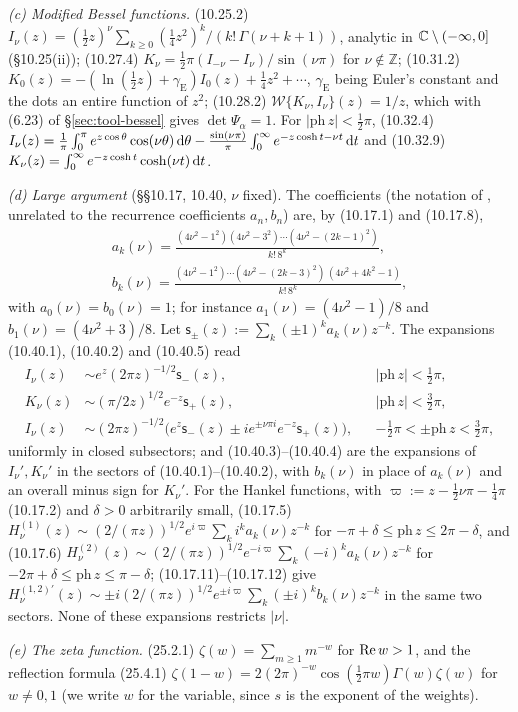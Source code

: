 \emph{(c) Modified Bessel functions.} (10.25.2)
$I_\nu(z)=(\frac12z)^\nu\sum_{k\ge0}(\frac14z^2)^k/(k!\,\Gamma(\nu+k+1))$, analytic in $\mathbb{C}\setminus(-\infty,0]$
(\S10.25(ii)); (10.27.4) $K_\nu=\frac12\pi(I_{-\nu}-I_\nu)/\sin(\nu\pi)$ for $\nu\notin\mathbb Z$; (10.31.2)
$K_0(z)=-(\ln(\frac12z)+\gamma_{\mathrm E})I_0(z)+\frac14z^2+\dotsb$, $\gamma_{\mathrm E}$ being Euler's constant and the
dots an entire function of $z^2$; (10.28.2) $\mathcal W\{K_\nu,I_\nu\}(z)=1/z$, which with (6.23) of
\S\ref{sec:tool-bessel} gives $\det\Psi_\alpha=1$. For $|\mathrm{ph}\,z|<\frac12\pi$, (10.32.4)
$I_\nu(z)=\frac1\pi\int_0^\pi e^{z\cos\theta}\cos(\nu\theta)\,\mathrm{d}\theta-\frac{\sin(\nu\pi)}\pi\int_0^\infty e^{-z\cosh t-\nu t}\,\mathrm{d} t$
and (10.32.9) $K_\nu(z)=\int_0^\infty e^{-z\cosh t}\cosh(\nu t)\,\mathrm{d} t$.

\emph{(d) Large argument} (\S\S10.17, 10.40, $\nu$ fixed). The coefficients (the notation of \cite{DLMF}, unrelated to the recurrence coefficients $a_n,b_n$) are, by (10.17.1) and (10.17.8),
\begin{gather*}
  a_k(\nu)=\frac{(4\nu^2-1^2)(4\nu^2-3^2)\cdots(4\nu^2-(2k-1)^2)}{k!\,8^k},\\
  b_k(\nu)=\frac{(4\nu^2-1^2)\cdots(4\nu^2-(2k-3)^2)\,(4\nu^2+4k^2-1)}{k!\,8^k},
\end{gather*}
with $a_0(\nu)=b_0(\nu)=1$; for instance $a_1(\nu)=(4\nu^2-1)/8$ and $b_1(\nu)=(4\nu^2+3)/8$. Let
$\mathsf s_\pm(z):=\sum_k(\pm1)^ka_k(\nu)z^{-k}$. The expansions (10.40.1), (10.40.2) and (10.40.5) read
\begin{align*}
  I_\nu(z)&\sim e^z(2\pi z)^{-1/2}\mathsf s_-(z),&&|\mathrm{ph}\,z|<\tfrac12\pi,\\
  K_\nu(z)&\sim(\pi/2z)^{1/2}e^{-z}\mathsf s_+(z),&&|\mathrm{ph}\,z|<\tfrac32\pi,\\
  I_\nu(z)&\sim(2\pi z)^{-1/2}\bigl(e^z\mathsf s_-(z)\pm ie^{\pm\nu\pi i}e^{-z}\mathsf s_+(z)\bigr),
    &&-\tfrac12\pi<\pm\mathrm{ph}\,z<\tfrac32\pi,
\end{align*}
uniformly in closed subsectors; and (10.40.3)--(10.40.4) are the expansions of $I_\nu',K_\nu'$ in the sectors of
(10.40.1)--(10.40.2), with $b_k(\nu)$ in place of $a_k(\nu)$ and an overall minus sign for $K_\nu'$. For the Hankel
functions, with $\varpi:=z-\frac12\nu\pi-\frac14\pi$ (10.17.2) and $\delta>0$ arbitrarily small, (10.17.5)
$H^{(1)}_\nu(z)\sim(2/(\pi z))^{1/2}e^{i\varpi}\sum_ki^ka_k(\nu)z^{-k}$ for $-\pi+\delta\le\mathrm{ph}\,z\le2\pi-\delta$,
and (10.17.6) $H^{(2)}_\nu(z)\sim(2/(\pi z))^{1/2}e^{-i\varpi}\sum_k(-i)^ka_k(\nu)z^{-k}$ for
$-2\pi+\delta\le\mathrm{ph}\,z\le\pi-\delta$; (10.17.11)--(10.17.12) give $H^{(1,2)\prime}_\nu(z)\sim\pm
i(2/(\pi z))^{1/2}e^{\pm i\varpi}\sum_k(\pm i)^kb_k(\nu)z^{-k}$ in the same two sectors. None of these expansions
restricts $|\nu|$.

\emph{(e) The zeta function.} (25.2.1) $\zeta(w)=\sum_{m\ge1}m^{-w}$ for $\operatorname{Re} w>1$, and the reflection formula (25.4.1)
$\zeta(1-w)=2(2\pi)^{-w}\cos(\frac12\pi w)\Gamma(w)\zeta(w)$ for $w\ne0,1$ (we write $w$ for the variable, since $s$ is
the exponent of the weights).

